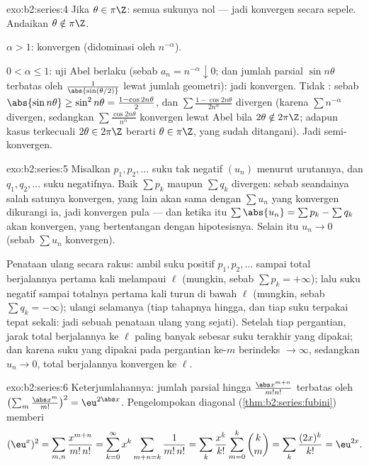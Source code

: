 \begin{solution}{exo:b2:series:4}
Jika $\theta \in \pi\Z$: semua sukunya nol --- jadi konvergen secara
sepele. Andaikan $\theta \notin \pi\Z$.

$\alpha > 1$: konvergen  (didominasi oleh $n^{-\alpha}$).

$0 < \alpha \leq 1$: uji Abel berlaku (sebab $a_n = n^{-\alpha}
\downarrow 0$; dan jumlah parsial $\sin n\theta$ terbatas oleh
$\frac{1}{\abs{\sin(\theta/2)}}$ lewat jumlah geometri): jadi konvergen.
Tidak : sebab $\abs{\sin n\theta} \geq \sin^2 n\theta = \frac{1 -
\cos 2n\theta}{2}$, dan $\sum \frac{1 - \cos 2n\theta}{2n^\alpha}$
divergen (karena $\sum n^{-\alpha}$ divergen, sedangkan $\sum
\frac{\cos 2n\theta}{n^\alpha}$ konvergen lewat Abel bila $2\theta
\notin 2\pi\Z$; adapun kasus terkecuali $2\theta \in 2\pi\Z$ berarti
$\theta \in \pi\Z$, yang sudah ditangani). Jadi semi-konvergen.
\end{solution}

\begin{solution}{exo:b2:series:5}
Misalkan $p_1, p_2, \dots$ suku tak negatif $(u_n)$ menurut urutannya,
dan $q_1, q_2, \dots$ suku negatifnya. Baik $\sum p_k$ maupun $\sum
q_k$ divergen: sebab seandainya salah satunya konvergen, yang lain akan
sama dengan $\sum u_n$ yang konvergen dikurangi ia, jadi konvergen pula
--- dan ketika itu $\sum \abs{u_n} = \sum p_k - \sum q_k$ akan konvergen,
yang bertentangan dengan hipotesisnya. Selain itu $u_n \to 0$ (sebab
$\sum u_n$ konvergen).

Penataan ulang secara rakus: ambil suku positif $p_1, p_2, \dots$ sampai
total berjalannya pertama kali melampaui $\ell$ (mungkin, sebab $\sum p_k
= +\infty$); lalu suku negatif sampai totalnya pertama kali turun di
bawah $\ell$ (mungkin, sebab $\sum q_k = -\infty$); ulangi selamanya
(tiap tahapnya hingga, dan tiap suku terpakai tepat sekali: jadi sebuah
penataan ulang yang sejati). Setelah tiap pergantian, jarak total
berjalannya ke $\ell$ paling banyak sebesar suku terakhir yang dipakai;
dan karena suku yang dipakai pada pergantian ke-$m$ berindeks
$\to \infty$, sedangkan $u_n \to 0$, total berjalannya konvergen ke $\ell$.
\end{solution}

\begin{solution}{exo:b2:series:6}
Keterjumlahannya: jumlah parsial hingga
$\frac{\abs x^{m+n}}{m!n!}$ terbatas oleh $\bigl(\sum_m
\frac{\abs x^m}{m!}\bigr)^2 = \eu^{2\abs x}$. Pengelompokan diagonal
(\cref{thm:b2:series:fubini}) memberi
\[
(\eu^{x})^2 = \sum_{m,n} \frac{x^{m+n}}{m!\,n!}
= \sum_{k=0}^{\infty} x^k \sum_{m+n=k} \frac{1}{m!\,n!}
= \sum_k \frac{x^k}{k!}\sum_{m=0}^{k}\binom km
= \sum_k \frac{(2x)^k}{k!} = \eu^{2x} .
\]
\end{solution}

